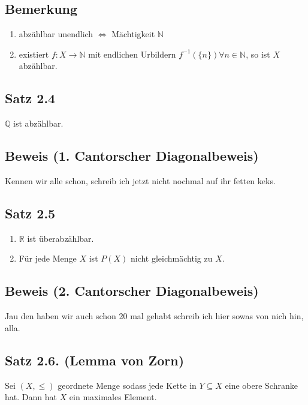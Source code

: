 \documentclass {article}
\begin{document}
\subsection*{Bemerkung}
\begin{enumerate}[label=(\arabic*)]
\item abzählbar unendlich  $\Leftrightarrow$ Mächtigkeit $\mathbb{N}$
\item existiert $f: X \rightarrow \mathbb{N}$ mit endlichen Urbildern $f^{-1}(\{n\}) \forall n\in \mathbb{N}$, so ist $X$ abzählbar.
\end{enumerate}
\subsection{Satz 2.4}
$\mathbb{Q}$ ist abzählbar.
\subsection*{Beweis (1. Cantorscher Diagonalbeweis)}
Kennen wir alle schon, schreib ich jetzt nicht nochmal auf ihr fetten keks.
\subsection{Satz 2.5}
\begin{enumerate}[label=(\alph*)]
\item $\mathbb{R}$ ist überabzählbar.
\item Für jede Menge $X$ ist $P(X)$ nicht gleichmächtig zu $X$.
\end{enumerate}
\subsection*{Beweis (2. Cantorscher Diagonalbeweis)}
Jau den haben wir auch schon 20 mal gehabt schreib ich hier sowas von nich hin, alla.
\subsection*{Satz 2.6. (Lemma von Zorn)}
Sei $(X, \leq)$ geordnete Menge sodass jede Kette in $Y \subseteq X$ eine obere Schranke hat. Dann hat $X$ ein maximales Element.\\
\end{document}
